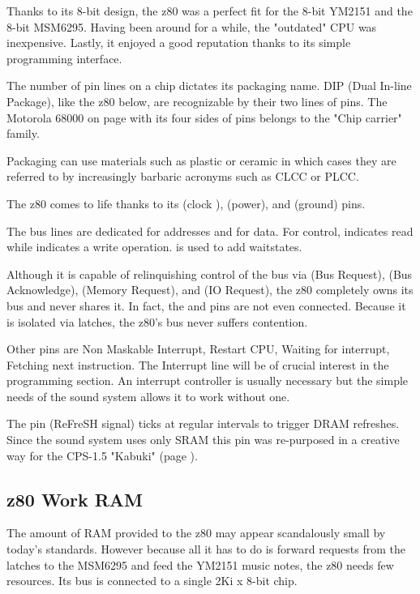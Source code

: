 Thanks to its 8-bit design, the z80 was a perfect fit for the 8-bit YM2151 and the 8-bit MSM6295. Having been around for a while, the "outdated" CPU was inexpensive. Lastly, it enjoyed a good reputation thanks to its simple programming interface.

\begin{trivia}
The number of pin lines on a chip dictates its packaging name. DIP (Dual In-line Package), like the z80 below, are recognizable by their two lines of pins. The Motorola 68000 on page \pageref{68000drawing} with its four sides of pins belongs to the "Chip carrier" family. 

Packaging can use materials such as plastic or ceramic in which cases they are referred to by increasingly barbaric acronyms such as CLCC or PLCC.
\end{trivia}


The z80 comes to life thanks to its  (clock ),  (power), and  (ground) pins.

The bus lines are dedicated  for addresses and  for data. For control,  indicates read while  indicates a write operation.  is used to add waitstates. 

Although it is capable of relinquishing control of the bus via  (Bus Request),  (Bus Acknowledge),  (Memory Request), and  (IO Request), the z80 completely owns its bus and never shares it. In fact, the  and  pins are not even connected.  Because it is isolated via latches, the z80's bus never suffers contention.


Other pins are  Non Maskable Interrupt,  Restart CPU,  Waiting for interrupt,  Fetching next instruction. The  Interrupt line will be of crucial interest in the programming section. An interrupt controller is usually necessary but the simple needs of the sound system allows it to work without one. 

\label{z80_pinRFSH}
The  pin (ReFreSH signal) ticks at regular intervals to trigger DRAM refreshes. Since the sound system uses only SRAM this pin was re-purposed in a creative way for the CPS-1.5 "Kabuki" (page \pageref{kabuki}).


\pagebreak

\subsection{z80 Work RAM}
The amount of RAM provided to the z80 may appear scandalously small by today's standards. However because all it has to do is forward requests from the latches to the MSM6295 and feed the YM2151 music notes, the z80 needs few resources. Its bus is connected to a single 2Ki x 8-bit  chip.

